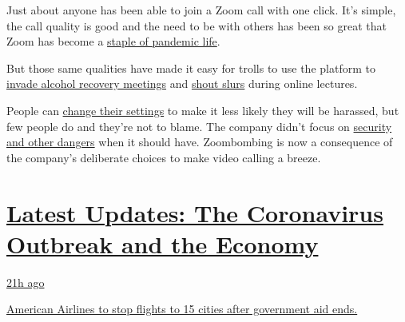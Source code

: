 Just about anyone has been able to join a Zoom call with one click. It's
simple, the call quality is good and the need to be with others has been
so great that Zoom has become a
\href{https://www.nytimes3xbfgragh.onion/2020/03/17/style/zoom-parties-coronavirus-memes.html}{staple
of pandemic life}.

But those same qualities have made it easy for trolls to use the
platform to
\href{https://www.businessinsider.com/aa-intergroup-meetings-zoom-bombing-trolls-alcoholics-anonymous-2020-3}{invade
alcohol recovery meetings} and
\href{https://www.nbcnews.com/tech/security/video-chats-familiar-forms-online-harassment-make-comeback-n1168806}{shout
slurs} during online lectures.

People can
\href{https://www.nytimes3xbfgragh.onion/2020/04/07/style/zoom-security-tips.html}{change
their settings} to make it less likely they will be harassed, but few
people do and they're not to blame. The company didn't focus on
\href{https://www.nytimes3xbfgragh.onion/2020/04/08/business/zoom-video-privacy-security-coronavirus.html}{security
and other dangers} when it should have. Zoombombing is now a consequence
of the company's deliberate choices to make video calling a breeze.

\hypertarget{latest-updates-the-coronavirus-outbreak-and-the-economy}{%
\section{\texorpdfstring{\href{https://www.nytimes3xbfgragh.onion/live/2020/08/20/business/stock-market-today-coronavirus?action=click\&pgtype=Article\&state=default\&region=MAIN_CONTENT_1\&context=storylines_live_updates}{Latest
Updates: The Coronavirus Outbreak and the
Economy}}{Latest Updates: The Coronavirus Outbreak and the Economy}}\label{latest-updates-the-coronavirus-outbreak-and-the-economy}}

\href{https://www.nytimes3xbfgragh.onion/live/2020/08/20/business/stock-market-today-coronavirus?action=click\&pgtype=Article\&state=default\&region=MAIN_CONTENT_1\&context=storylines_live_updates\#american-airlines-to-stop-flights-to-15-cities-after-government-aid-ends}{21h
ago}

\href{https://www.nytimes3xbfgragh.onion/live/2020/08/20/business/stock-market-today-coronavirus?action=click\&pgtype=Article\&state=default\&region=MAIN_CONTENT_1\&context=storylines_live_updates\#american-airlines-to-stop-flights-to-15-cities-after-government-aid-ends}{American
Airlines to stop flights to 15 cities after government aid ends.}

